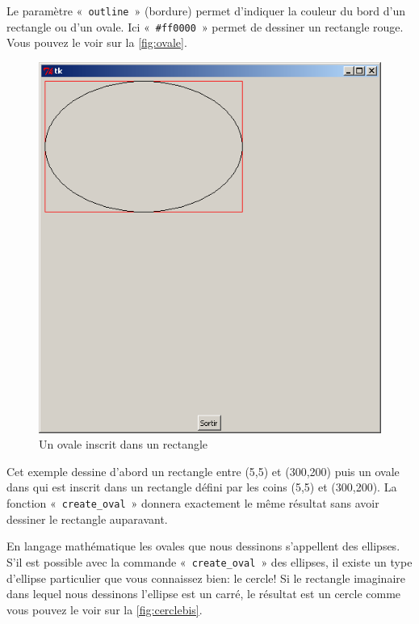 Le paramètre «~\texttt{outline}~» (bordure) permet d'indiquer la couleur du bord d'un rectangle ou d'un ovale.
Ici «~\texttt{\#ff0000}~» permet de dessiner un rectangle rouge. Vous pouvez le voir sur la \autoref{fig:ovale}.

\begin{figure}[h!]
\centering
\includegraphics[scale=0.4]{images/ovale}
\caption{Un ovale inscrit dans un rectangle}\label{fig:ovale}
\end{figure}

Cet exemple dessine d'abord un rectangle entre (5,5) et (300,200) puis un ovale dans qui est inscrit dans un rectangle défini par les coins (5,5) et (300,200). La fonction «~\texttt{create\_oval}~» donnera exactement le même résultat sans avoir dessiner le rectangle auparavant.

En langage mathématique les ovales que nous dessinons s'appellent des ellipses.
S'il est possible avec la commande «~\texttt{create\_oval}~»  des ellipses, il existe un type d'ellipse particulier que vous connaissez bien: le cercle!  Si le rectangle imaginaire dans lequel nous dessinons l'ellipse est un carré, le résultat est un cercle comme vous pouvez le voir sur la \autoref{fig:cerclebis}.

